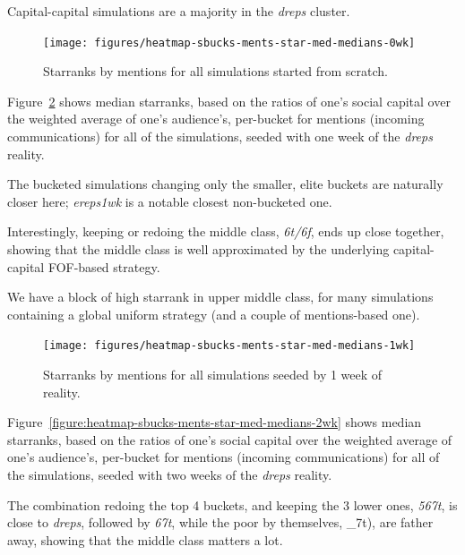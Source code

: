 \documentclass[10pt,oneside]{memoir}
\begin{document}
Capital-capital simulations are a majority in the {\itshape dreps} cluster.



\begin{figure}
\begin{center}
    \texttt{[image: figures/heatmap-sbucks-ments-star-med-medians-0wk]}
    \caption{Starranks by mentions for all simulations started from scratch.}
    \label{figure:heatmap-sbucks-ments-star-med-medians-0wk}
\end{center}
\end{figure}
Figure~\ref{figure:heatmap-sbucks-ments-star-med-medians-1wk} shows median starranks, based on the ratios of one's social capital over the weighted average of one's audience's, per-bucket for mentions (incoming communications) for all of the simulations, seeded with one week of the {\itshape dreps} reality.


The bucketed simulations changing only the smaller, elite buckets are naturally closer here; {\itshape ereps1wk} is a notable closest non-bucketed one.


Interestingly, keeping or redoing the middle class, {\itshape 6t/6f}, ends up close together, showing that the middle class is well approximated by the underlying capital-capital FOF-based strategy.


We have a block of high starrank in upper middle class, for many simulations containing a global uniform strategy (and a couple of mentions-based one).



\begin{figure}
\begin{center}
    \texttt{[image: figures/heatmap-sbucks-ments-star-med-medians-1wk]}
    \caption{Starranks by mentions for all simulations seeded by 1 week of reality.}
    \label{figure:heatmap-sbucks-ments-star-med-medians-1wk}
\end{center}
\end{figure}
Figure~\ref{figure:heatmap-sbucks-ments-star-med-medians-2wk} shows median starranks, based on the ratios of one's social capital over the weighted average of one's audience's, per-bucket for mentions (incoming communications) for all of the simulations, seeded with two weeks of the {\itshape dreps} reality.


The combination redoing the top 4 buckets, and keeping the 3 lower ones, {\itshape 567t}, is close to {\itshape dreps}, followed by {\itshape 67t}, while the poor by themselves, \_7t), are father away, showing that the middle class matters a lot.
\end{document}
